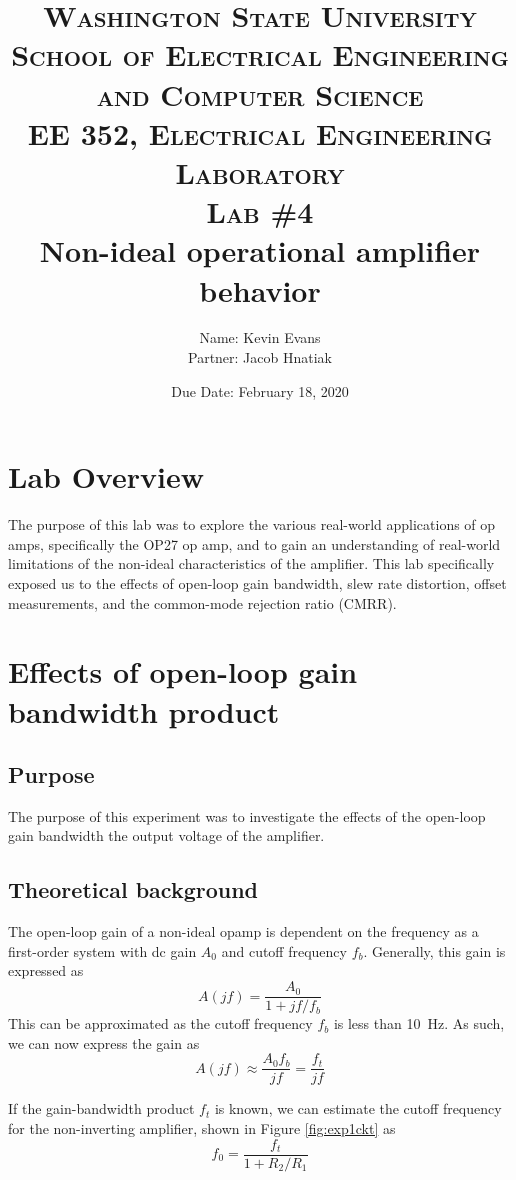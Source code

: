 \documentclass{report}
\title{
	\textsc{ \small
		Washington State University \\
		School of Electrical Engineering and Computer Science \\
		EE 352, Electrical Engineering Laboratory
	} \\
	{\textsc{\small Lab \#4}} \\
	Non-ideal operational amplifier behavior
}
\author{
	Name: Kevin Evans \\
	Partner: Jacob Hnatiak
}
\date{Due Date: February 18, 2020}
\begin{document}
\maketitle

\section*{Lab Overview}

The purpose of this lab was to explore the various real-world applications of op amps, specifically the OP27 op amp, and to gain an understanding of real-world limitations of the non-ideal characteristics of the amplifier. This lab specifically exposed us to the effects of open-loop gain bandwidth, slew rate distortion, offset measurements, and the common-mode rejection ratio (CMRR).

\section{Effects of open-loop gain bandwidth product}

\subsection{Purpose}

The purpose of this experiment was to investigate the effects of the open-loop gain bandwidth the output voltage of the amplifier.

\subsection{Theoretical background}
The open-loop gain of a non-ideal opamp is dependent on the frequency as a first-order system with dc gain $A_0$ and cutoff frequency $f_b$. Generally, this gain is expressed as \begin{equation}
	A(jf) = \frac{A_0}{1 + jf / f_b}
\end{equation}
This can be approximated as the cutoff frequency $f_b$ is less than \SI{10}{\Hz}. As such, we can now express the gain as
\begin{equation}
	A(jf) \approx \frac{A_0 f_b}{jf} = \frac{f_t}{jf}
\end{equation}

If the gain-bandwidth product $f_t$ is known, we can estimate the cutoff frequency for the non-inverting amplifier, shown in Figure \ref{fig:exp1ckt} as
\begin{equation}
	f_0 = \frac{f_t}{1 + R_2 / R_1}
\end{equation}
\end{document}
